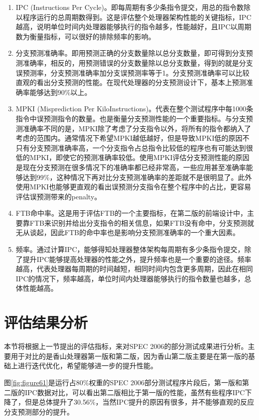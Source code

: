 \begin{enumerate}
	\item IPC (Instructions Per Cycle)。即每周期有多少条指令提交，用总的指令数除以程序运行的总周期数得到。这是评估整个处理器架构性能的关键指标，IPC越高，说明单位时间内处理器能够执行的指令越多，性能越好，且IPC以周期数为衡量指标，可以很好的排除频率的影响。
	\item 分支预测准确率。即用预测正确的分支数量除以总分支数量，即可得到分支预测准确率，相反的，用预测错误的分支数量除以总分支数量，得到的就是分支误预测率，分支预测准确率加分支误预测率等于1。分支预测准确率可以比较直观的看出分支预测的性能。在现代处理器的分支预测设计下，基本上预测准确率能够达到90\%以上。
	\item MPKI (Misprediction Per KiloInstructions)。代表在整个测试程序中每1000条指令中误预测指令的数量。也是衡量分支预测性能的一个重要指标。与分支预测准确率不同的是，MPKI除了考虑了分支指令以外，将所有的指令都纳入了考虑的范围内。通常情况下希望MPKI越低越好，但是导致MPKI低的原因不只有分支预测准确率高，一个分支指令占总指令比较低的程序也有可能达到很低的MPKI，即使它的预测准确率较低。使用MPKI评估分支预测性能的原因是现在分支预测在很多情况下的准确率都已经非常高，一些应用甚至准确率能够达到99\%，这种情况下再对比分支预测准确率的差距就不是很明显了。此外使用MPKI也能够更直观的看出误预测分支指令在整个程序中的占比，更容易评估误预测带来的penalty。
	\item FTB命中率。这是用于评估FTB的一个主要指标，在第二版的前端设计中，主要靠FTB来识别并给出分支指令的相关信息，如果FTB没有命中，分支预测就无从谈起，因此FTB的命中率也是影响分支预测准确率的一个重大因素。
	\item 频率。通过计算IPC，能够得知处理器整体架构每周期有多少条指令提交，除了提升IPC能够提高处理器的性能之外，提升频率也是一个重要的途径。频率越高，代表处理器每周期的时间越短，相同时间内包含更多周期，因此在相同IPC的情况下，频率越高，单位时间内处理器能够执行的指令数量也越多，总体性能越高。
\end{enumerate}

\section{评估结果分析}

本节将根据上一节提出的评估指标，来对SPEC 2006的部分测试成果进行分析。主要用于对比的是香山处理器第一版和第二版，因为香山第二版主要是在第一版的基础上进行迭代优化，希望能够进一步的提升性能。

图\ref{fig:figure61}是运行占80\%权重的SPEC 2006部分测试程序片段后，第一版和第二版的IPC数据对比，可以看出第二版相比于第一版的性能，虽然有些程序IPC下降了，但是总体提升了30.56\%，当然IPC提升的原因有很多，并不能够直观的反应分支预测部分的提升。

